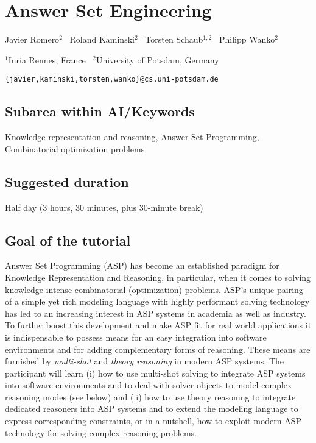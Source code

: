 \documentclass{article}
\begin{document}
\section*{Answer Set Engineering}

Javier Romero$^2$ \
Roland Kaminski$^2$ \
Torsten Schaub$^{1,2}$ \
Philipp Wanko$^2$

\medskip
\noindent
$^1$Inria Rennes, France \
$^2$University of Potsdam, Germany

\medskip
\noindent
\texttt{\{javier,kaminski,torsten,wanko\}@cs.uni-potsdam.de}

\subsection*{Subarea within AI/Keywords}

Knowledge representation and reasoning,
Answer Set Programming,
Combinatorial optimization problems

\subsection*{Suggested duration}

Half day (3 hours, 30 minutes, plus 30-minute break)

\subsection*{Goal of the tutorial}

Answer Set Programming (ASP) has become an established paradigm for Knowledge Representation and Reasoning,
in particular, when it comes to solving knowledge-intense combinatorial (optimization) problems.
ASP's unique pairing of a simple yet rich modeling language with highly performant solving technology
has led to an increasing interest in ASP systems in academia as well as industry.
To further boost this development and make ASP fit for real world applications it is indispensable to possess means
for an easy integration into software environments and for adding complementary forms of reasoning.
These means are furnished by \emph{multi-shot} and \emph{theory reasoning} in modern ASP systems.
The participant will learn
(i) how to use multi-shot solving
to integrate ASP systems into software environments and
to deal with solver objects to model complex reasoning modes (see below)
and
(ii) how to use theory reasoning
to integrate dedicated reasoners into ASP systems and
to extend the modeling language to express corresponding constraints,
or in a nutshell, how to exploit modern ASP technology for solving complex reasoning problems.
\end{document}
